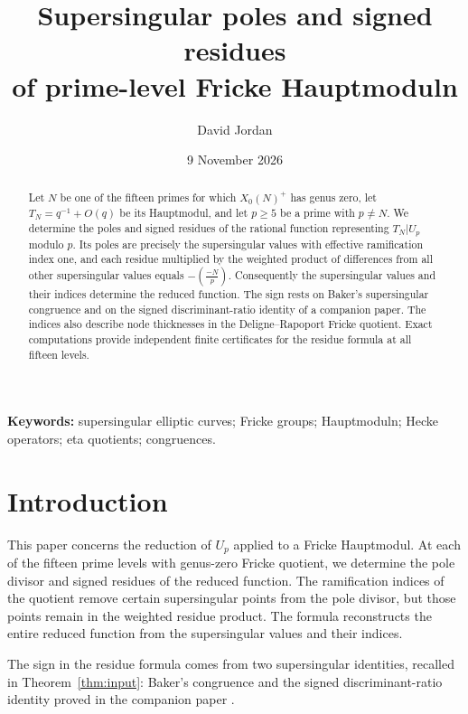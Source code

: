\documentclass[11pt,a4paper]{article}
\title{Supersingular poles and signed residues\\of prime-level Fricke Hauptmoduln}
\author{David Jordan}
\date{9 November 2026}
\numberwithin{equation}{section}
\theoremstyle{definition}
\theoremstyle{remark}
\begin{document}
\maketitle
\begin{abstract}
Let $N$ be one of the fifteen primes for which $X_0(N)^+$ has genus zero,
let $T_N=q^{-1}+O(q)$ be its Hauptmodul, and let $p\ge5$ be a prime with
$p\ne N$. We determine the poles and signed residues of the rational
function representing $T_N|U_p$ modulo $p$. Its poles are precisely the
supersingular values with effective ramification index one, and each
residue multiplied by the weighted product of differences from all
other supersingular values equals $-\left(\frac{-N}{p}\right)$.
Consequently the supersingular values and their indices determine the
reduced function. The sign rests on Baker's supersingular congruence and
on the signed discriminant-ratio identity of a companion paper.
The indices also describe node thicknesses in the Deligne--Rapoport
Fricke quotient. Exact computations provide independent finite
certificates for the residue formula at all fifteen levels.
\end{abstract}
\noindent\textbf{Keywords:} supersingular elliptic curves; Fricke groups; Hauptmoduln; Hecke operators; eta quotients; congruences.

\section{Introduction}\label{sec:intro}
This paper concerns the reduction of $U_p$ applied to a
Fricke Hauptmodul. At each of the fifteen prime levels with genus-zero
Fricke quotient, we determine the pole divisor and signed residues of
the reduced function. The ramification indices of the quotient remove
certain supersingular points from the pole divisor, but those points
remain in the weighted residue product. The formula reconstructs the
entire reduced function from the supersingular values and their indices.

The sign in the residue formula comes from two supersingular identities,
recalled in Theorem~\ref{thm:input}: Baker's congruence \citep{Baker98}
and the signed discriminant-ratio identity proved in the companion paper
\citep{JordanFactorial}.
\end{document}

